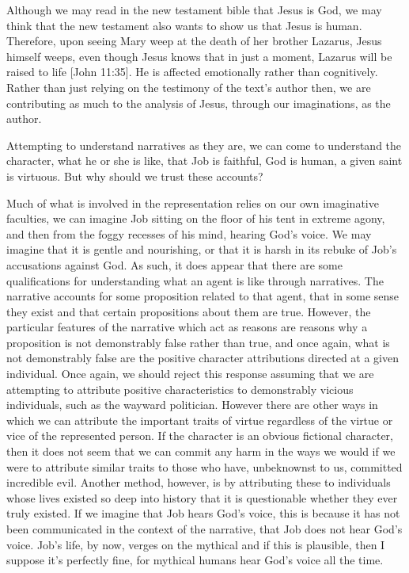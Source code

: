 \documentclass[phdthesis,12pt,final]{wuthesis}
\theoremstyle{definition}
\theoremstyle{definition}
\theoremstyle{definition}
\theoremstyle{definition}
\theoremstyle{remark}
\begin{document}
Although we may read in the new testament bible that Jesus is God, we may think that the new testament also wants to show us that Jesus is human. Therefore, upon seeing Mary weep at the death of her brother Lazarus, Jesus himself weeps, even though Jesus knows that in just a moment, Lazarus will be raised to life {[}John 11:35{]}. He is affected emotionally rather than cognitively. Rather than just relying on the testimony of the text's author then, we are contributing as much to the analysis of Jesus, through our imaginations, as the author.

Attempting to understand narratives as they are, we can come to understand the character, what he or she is like, that Job is faithful, God is human, a given saint is virtuous. But why should we trust these accounts?

Much of what is involved in the representation relies on our own imaginative faculties, we can imagine Job sitting on the floor of his tent in extreme agony, and then from the foggy recesses of his mind, hearing God's voice. We may imagine that it is gentle and nourishing, or that it is harsh in its rebuke of Job's accusations against God. As such, it does appear that there are some qualifications for understanding what an agent is like through narratives. The narrative accounts for some proposition related to that agent, that in some sense they exist and that certain propositions about them are true. However, the particular features of the narrative which act as reasons are reasons why a proposition is not demonstrably false rather than true, and once again, what is not demonstrably false are the positive character attributions directed at a given individual. Once again, we should reject this response assuming that we are attempting to attribute positive characteristics to demonstrably vicious individuals, such as the wayward politician. However there are other ways in which we can attribute the important traits of virtue regardless of the virtue or vice of the represented person. If the character is an obvious fictional character, then it does not seem that we can commit any harm in the ways we would if we were to attribute similar traits to those who have, unbeknownst to us, committed incredible evil. Another method, however, is by attributing these to individuals whose lives existed so deep into history that it is questionable whether they ever truly existed. If we imagine that Job hears God's voice, this is because it has not been communicated in the context of the narrative, that Job does not hear God's voice. Job's life, by now, verges on the mythical and if this is plausible, then I suppose it's perfectly fine, for mythical humans hear God's voice all the time.
\end{document}
